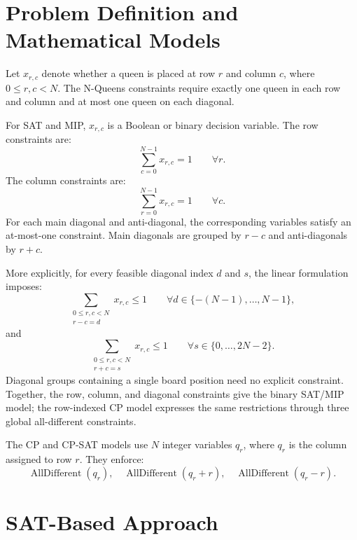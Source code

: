 \documentclass[a4paper,fleqn]{cas-sc}
\begin{document}
\section{Problem Definition and Mathematical Models}

Let $x_{r,c}$ denote whether a queen is placed at row $r$ and column $c$, where $0 \le r,c < N$. The N-Queens constraints require exactly one queen in each row and column and at most one queen on each diagonal.

For SAT and MIP, $x_{r,c}$ is a Boolean or binary decision variable. The row constraints are:
\begin{equation}
\sum_{c=0}^{N-1} x_{r,c} = 1 \qquad \forall r.
\end{equation}
The column constraints are:
\begin{equation}
\sum_{r=0}^{N-1} x_{r,c} = 1 \qquad \forall c.
\end{equation}
For each main diagonal and anti-diagonal, the corresponding variables satisfy an at-most-one constraint. Main diagonals are grouped by $r-c$ and anti-diagonals by $r+c$.

More explicitly, for every feasible diagonal index $d$ and $s$, the linear formulation imposes:
\begin{equation}
\sum_{\substack{0\le r,c<N\\r-c=d}} x_{r,c} \leq 1
\qquad \forall d\in\{-(N-1),\ldots,N-1\},
\end{equation}
and
\begin{equation}
\sum_{\substack{0\le r,c<N\\r+c=s}} x_{r,c} \leq 1
\qquad \forall s\in\{0,\ldots,2N-2\}.
\end{equation}
Diagonal groups containing a single board position need no explicit constraint. Together, the row, column, and diagonal constraints give the binary SAT/MIP model; the row-indexed CP model expresses the same restrictions through three global all-different constraints.

The CP and CP-SAT models use $N$ integer variables $q_r$, where $q_r$ is the column assigned to row $r$. They enforce:
\begin{equation}
\operatorname{AllDifferent}(q_r),\quad
\operatorname{AllDifferent}(q_r+r),\quad
\operatorname{AllDifferent}(q_r-r).
\end{equation}

\section{SAT-Based Approach}
\end{document}
